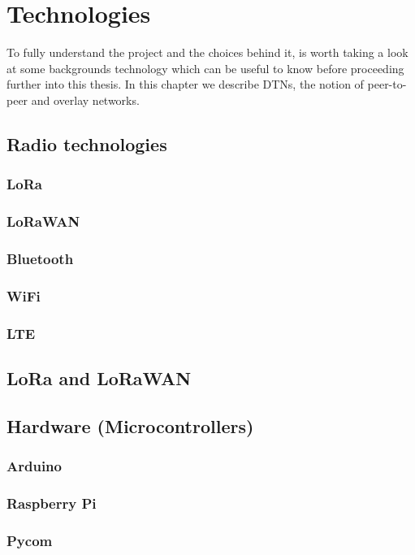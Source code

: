 
\chapter{Technologies}\label{chapter:technologies}

	To fully understand the project and the choices behind it, is worth taking a look at some backgrounds technology which can be useful to know before proceeding further into this thesis.
	In this chapter we describe DTNs, the notion of peer-to-peer and overlay networks.

	

	\section{Radio technologies}\label{sec:section_two}
	
		\subsection{LoRa}
		
		\subsection{LoRaWAN}
		
		\subsection{Bluetooth}		
		
		\subsection{WiFi}
	
		\subsection{LTE}
	
	\section{LoRa and LoRaWAN}
	
	\section{Hardware (Microcontrollers)}
	
	\subsection{Arduino}
	
	\subsection{Raspberry Pi}
	
	\subsection{Pycom}